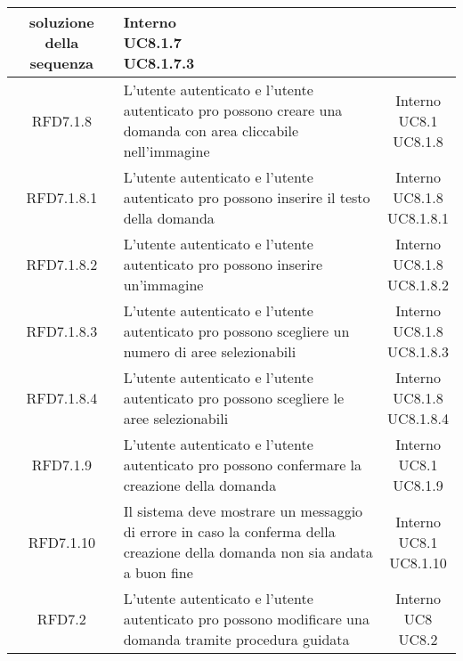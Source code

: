 \begin{longtable}{|c|>{\centering}m{7cm}|c|}
soluzione della sequenza & \makecell{Interno\\ UC8.1.7 \\UC8.1.7.3 } \\ \hline
			 \hypertarget{{RFD7.1.8}}{{RFD7.1.8}} & L’utente autenticato e l’utente
autenticato pro possono creare una
domanda con area cliccabile
nell’immagine & \makecell{Interno\\ UC8.1 \\UC8.1.8 } \\ \hline
			 \hypertarget{{RFD7.1.8.1}}{{RFD7.1.8.1}} & L’utente autenticato e l’utente
autenticato pro possono inserire il testo
della domanda & \makecell{Interno\\ UC8.1.8 \\UC8.1.8.1 } \\ \hline
			 \hypertarget{{RFD7.1.8.2}}{{RFD7.1.8.2}} & L’utente autenticato e l’utente
autenticato pro possono inserire
un’immagine & \makecell{Interno\\ UC8.1.8 \\UC8.1.8.2 } \\ \hline
			 \hypertarget{{RFD7.1.8.3}}{{RFD7.1.8.3}} & L’utente autenticato e l’utente
autenticato pro possono scegliere un
numero di aree selezionabili & \makecell{Interno\\ UC8.1.8 \\UC8.1.8.3 } \\ \hline
			 \hypertarget{{RFD7.1.8.4}}{{RFD7.1.8.4}} & L’utente autenticato e l’utente
autenticato pro possono scegliere le aree
selezionabili & \makecell{Interno\\ UC8.1.8 \\UC8.1.8.4 } \\ \hline
			 \hypertarget{{RFD7.1.9}}{{RFD7.1.9}} & L’utente autenticato e l’utente
autenticato pro possono confermare la
creazione della domanda & \makecell{Interno\\ UC8.1 \\UC8.1.9 } \\ \hline
			 \hypertarget{{RFD7.1.10}}{{RFD7.1.10}} & Il sistema deve mostrare un messaggio di
errore in caso la conferma della creazione
della domanda non sia andata a buon fine & \makecell{Interno\\ UC8.1 \\UC8.1.10 } \\ \hline
			 \hypertarget{{RFD7.2}}{{RFD7.2}} & L’utente autenticato e l’utente
autenticato pro possono modificare una
domanda tramite procedura guidata & \makecell{Interno\\ UC8 \\UC8.2 } \\ \hline

\end{longtable}
